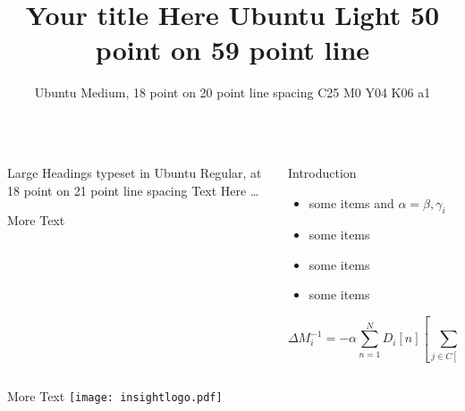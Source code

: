 \documentclass[final,hyperref={pdfpagelabels=false}]{beamer}
\title{Your title Here Ubuntu Light 50 point on 59 point line}
\author{Ubuntu Medium, 18 point on 20 point line spacing C25 M0 Y04 K06 a1}
\begin{document}
\begin{frame}{}
\begin{columns}[T] %
\begin{column}{.43\paperwidth} %

\begin{block}{Large Headings typeset in Ubuntu Regular, at 18 point on 21 point line spacing}
Text Here \dots

More Text \blindtext
\end{block}

\end{column}
\begin{column}{.43\paperwidth} %


\begin{block}{Introduction}
	\begin{itemize}
		\item some items and $\alpha=\beta,\gamma_{i}$
		\item some items
		\item some items
		\item some items
	\end{itemize}

	$$\Delta M_i^{-1} = - \alpha \sum_{n=1}^N D_i \left[ n \right] \left[ \sum_{j \in C \left[ i \right]}^{} F_{ji} \left[ n-1 \right] + Fext_i \left[ n^{-1} \right] \right]$$
	
\end{block}

\end{column}
\end{columns}

\begin{columns}[T]
\begin{column}{.895\paperwidth}
\begin{block}{}
More Text \blindtext
\texttt{[image: insightlogo.pdf]} \\
\end{block}
\end{column}
\end{columns}


\end{frame}
\end{document}
